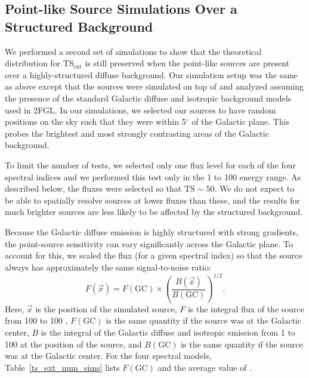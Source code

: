 \documentclass[12pt,preprint]{aastex}
\newcommand{\mev}{\text{MeV}\xspace}
\newcommand{\gev}{\text{GeV}\xspace}
\newcommand{\tsext}{{\ensuremath{\text{TS}_{\text{ext}}}}\xspace}
\newcommand{\ts}{\text{TS}\xspace}
\newcommand{\degree}{\ensuremath{^\circ}\xspace}
\newcommand{\newtext}[1]{{\bfseries \color{red}#1}}
\begin{document}
\newtext{

\subsection{\newtext{Point-like Source Simulations Over a Structured Background}}
\label{validation_over_plane}

We performed a second set of simulations to show that the theoretical distribution
for \tsext is still preserved when the point-like sources are present over
a highly-structured diffuse background.
Our simulation setup was the same as above except that the sources were
simulated on top of and analyzed assuming the presence of the standard
Galactic diffuse and isotropic background models used in 2FGL.  In our
simulations, we selected our sources to have random positions on the sky
such that they were within 5\degree of the Galactic plane. This probes the 
brightest and most strongly contrasting areas of the Galactic background.

To limit the number of tests, we selected only one flux
level for each of the four spectral indices and we performed
this test only in the 1 \gev to 100 \gev energy range. 
As described below, the fluxes were selected so that $\ts\sim50$. We do not
expect to be able to spatially resolve sources 
at lower fluxes than these, and the results for much brighter sources
are less likely to be affected by the 
structured background.

Because the Galactic diffuse emission is highly structured with
strong gradients, the point-source
sensitivity can vary significantly across the Galactic plane.
To account for this, we scaled the flux (for a given spectral index)
so that the source always has approximately the same signal-to-noise ratio:
\begin{equation}
  \label{scale_flux_by_background}
  F(\vec{x}) = F(\text{GC}) \times \left(
  \frac{B(\vec{x})}{B(\text{GC})}\right)^{1/2}.
\end{equation}
Here, $\vec{x}$ is the position of the simulated source, $F$ is the integral
flux of the source from 100 \mev to 100 \gev, $F(\text{GC})$
is the same quantity if the source was at the Galactic center, $B$
is the integral of the Galactic diffuse and isotropic emission
from 1 \gev to 100 \gev at the position of the source, and $B(\text{GC})$ is the same quantity
if the source was at the Galactic center.  For the four spectral models,
Table~\ref{ts_ext_num_sims} lists $F(\text{GC})$ and the average value of \ts.

}
\end{document}
